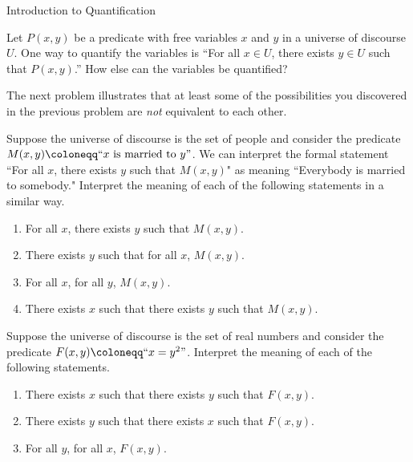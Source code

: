 \begin{section}{Introduction to Quantification}
\begin{problem}\label{prob:ways to quantify}
Let $P(x,y)$ be a predicate with free variables $x$ and $y$ in a universe of discourse $U$. One way to quantify the variables is ``For all $x \in U$, there exists $y \in U$ such that $P(x,y)$.'' How else can the variables be quantified?
\end{problem}

The next problem illustrates that at least some of the possibilities you discovered in the previous problem are \emph{not} equivalent to each other.

\begin{problem}
Suppose the universe of discourse is the set of people and consider the predicate $M(x,y)\coloneqq ``x\mbox{ is married to }y"$.  We can interpret the formal statement ``For all $x$, there exists $y$ such that $M(x,y)$" as meaning ``Everybody is married to somebody."  Interpret the meaning of each of the following statements in a similar way.
\begin{enumerate}[label=\textrm{(\alph*)}]
\item For all $x$, there exists $y$ such that $M(x,y)$.
\item There exists $y$ such that for all $x$, $M(x,y)$.
\item For all $x$, for all $y$, $M(x,y)$.
\item There exists $x$ such that there exists $y$ such that $M(x,y)$.
\end{enumerate}
\end{problem}

\begin{problem}
Suppose the universe of discourse is the set of real numbers and consider the predicate $F(x,y)\coloneqq ``x=y^2"$. Interpret the meaning of each of the following statements.
\begin{enumerate}[label=\textrm{(\alph*)}]
\item There exists $x$ such that there exists $y$ such that $F(x,y)$.
\item There exists $y$ such that there exists $x$ such that $F(x,y)$.
\item For all $y$, for all $x$, $F(x,y)$.
\end{enumerate}
\end{problem}



\end{section}
